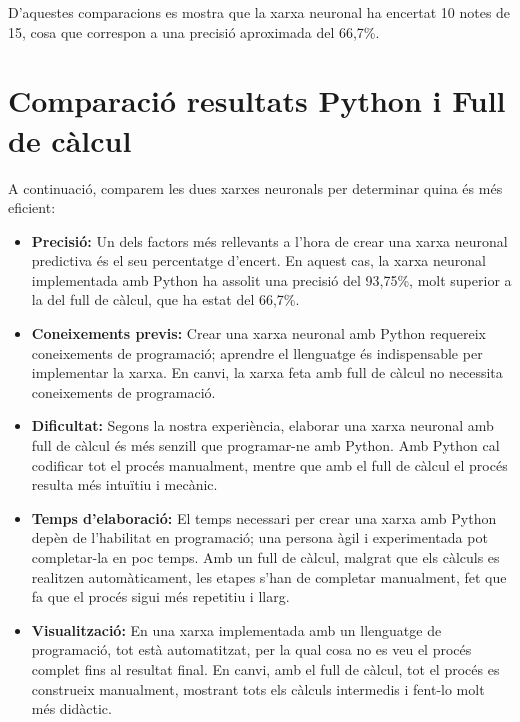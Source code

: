 D’aquestes comparacions es mostra que la xarxa neuronal ha encertat 10 notes de 15, cosa que correspon a una precisió aproximada del 66,7\%.

\section{Comparació resultats Python i Full de càlcul}

A continuació, comparem les dues xarxes neuronals per determinar quina és més eficient:

\begin{itemize}

\item \textbf{Precisió:} Un dels factors més rellevants a l’hora de crear una xarxa neuronal predictiva és el seu percentatge d’encert. En aquest cas, la xarxa neuronal implementada amb Python ha assolit una precisió del 93,75\%, molt superior a la del full de càlcul, que ha estat del 66,7\%.

\item \textbf{Coneixements previs:} Crear una xarxa neuronal amb Python requereix coneixements de programació; aprendre el llenguatge és indispensable per implementar la xarxa. En canvi, la xarxa feta amb full de càlcul no necessita coneixements de programació.
\clearpage
\item \textbf{Dificultat:} Segons la nostra experiència, elaborar una xarxa neuronal amb full de càlcul és més senzill que programar-ne amb Python. Amb Python cal codificar tot el procés manualment, mentre que amb el full de càlcul el procés resulta més intuïtiu i mecànic.

\item \textbf{Temps d’elaboració:} El temps necessari per crear una xarxa amb Python depèn de l’habilitat en programació; una persona àgil i experimentada pot completar-la en poc temps. Amb un full de càlcul, malgrat que els càlculs es realitzen automàticament, les etapes s’han de completar manualment, fet que fa que el procés sigui més repetitiu i llarg.

\item \textbf{Visualització:} En una xarxa implementada amb un llenguatge de programació, tot està automatitzat, per la qual cosa no es veu el procés complet fins al resultat final. En canvi, amb el full de càlcul, tot el procés es construeix manualment, mostrant tots els càlculs intermedis i fent-lo molt més didàctic.

\end{itemize}


